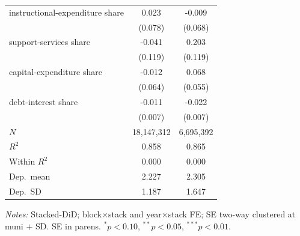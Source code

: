 \begin{table}[!htbp]
\begin{tabular}{lcc}
    instructional-expenditure share & 0.023 & -0.009 \\
                      & (0.078) & (0.068) \\
    support-services share & -0.041 & 0.203\sym{*} \\
                      & (0.119) & (0.119) \\
    capital-expenditure share & -0.012 & 0.068 \\
                      & (0.064) & (0.055) \\
    debt-interest share & -0.011 & -0.022\sym{***} \\
                      & (0.007) & (0.007) \\
    \midrule
    $N$ & 18,147,312 & 6,695,392 \\
    $R^2$ & 0.858 & 0.865 \\
    Within $R^2$ & 0.000 & 0.000 \\
    Dep.\ mean & 2.227 & 2.305 \\
    Dep.\ SD & 1.187 & 1.647 \\
    \bottomrule
  \end{tabular}
  \vspace{0.3em}
  \begin{minipage}{0.95\textwidth}
    \footnotesize \textit{Notes:} Stacked-DiD; block$\times$stack and year$\times$stack FE; SE two-way clustered at muni $+$ SD. SE in parens. $^{*}p<0.10$, $^{**}p<0.05$, $^{***}p<0.01$.
  \end{minipage}
\end{table}
